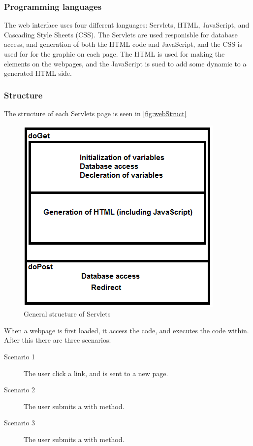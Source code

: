 \subsubsection{Programming languages}
The web interface uses four different languages: Servlets, HTML, JavaScript, and Cascading Style Sheets (CSS). The Servlets are used responisble for database access, and generation of both the HTML code and JavaScript, and the CSS is used for for the graphic on each page. The HTML is used for making the elements on the webpages, and the JavaScript is sued to add some dynamic to a generated HTML side.

\subsubsection{Structure}
The structure of each Servlets page is seen in \autoref{fig:webStruct}
\begin{figure}
	\centering
		\includegraphics{images/webStruct.png}
	\caption{General structure of Servlets}
	\label{fig:webStruct}
\end{figure}

When a webpage is first loaded, it access the  code, and executes the code within. After this there are three scenarios:
\begin{description}
	\item[Scenario 1] The user click a link, and is sent to a new page.
	\item[Scenario 2] The user submits a  with  method. 
	\item[Scenario 3] The user submits a  with  method.
\end{description}

